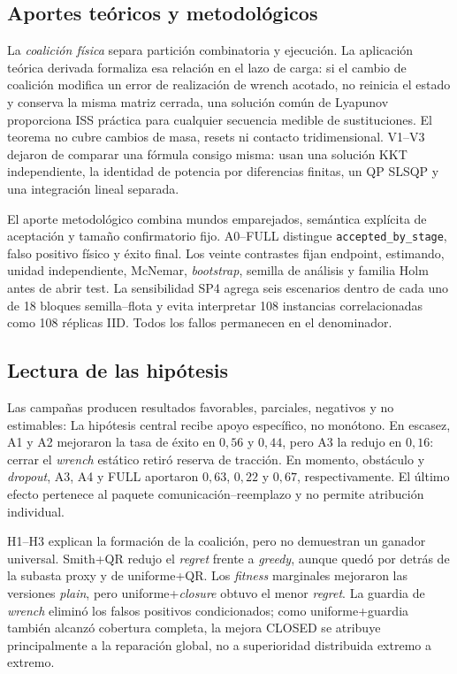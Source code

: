 \subsection*{Aportes teóricos y metodológicos}

La \emph{coalición física} separa partición combinatoria y ejecución. La aplicación teórica derivada formaliza esa relación en el lazo de carga: si el cambio de coalición modifica un error de realización de wrench acotado, no reinicia el estado y conserva la misma matriz cerrada, una solución común de Lyapunov proporciona ISS práctica para cualquier secuencia medible de sustituciones. El teorema no cubre cambios de masa, resets ni contacto tridimensional. V1--V3 dejaron de comparar una fórmula consigo misma: usan una solución KKT independiente, la identidad de potencia por diferencias finitas, un QP SLSQP y una integración lineal separada.

El aporte metodológico combina mundos emparejados, semántica explícita de aceptación y tamaño confirmatorio fijo. A0--FULL distingue \texttt{accepted\_by\_stage}, falso positivo físico y éxito final. Los veinte contrastes fijan endpoint, estimando, unidad independiente, McNemar, \emph{bootstrap}, semilla de análisis y familia Holm antes de abrir test. La sensibilidad SP4 agrega seis escenarios dentro de cada uno de 18 bloques semilla--flota y evita interpretar 108 instancias correlacionadas como 108 réplicas IID. Todos los fallos permanecen en el denominador.
\subsection*{Lectura de las hipótesis}

Las campañas producen resultados favorables, parciales, negativos y no estimables:
La hip\'otesis central recibe apoyo espec\'ifico, no mon\'otono. En escasez, A1 y A2 mejoraron la tasa de \'exito en $0{,}56$ y $0{,}44$, pero A3 la redujo en $0{,}16$: cerrar el \emph{wrench} est\'atico retir\'o reserva de tracci\'on. En momento, obst\'aculo y \emph{dropout}, A3, A4 y FULL aportaron $0{,}63$, $0{,}22$ y $0{,}67$, respectivamente. El \'ultimo efecto pertenece al paquete comunicaci\'on--reemplazo y no permite atribuci\'on individual.

H1--H3 explican la formaci\'on de la coalici\'on, pero no demuestran un ganador universal. Smith+QR redujo el \emph{regret} frente a \emph{greedy}, aunque qued\'o por detr\'as de la subasta proxy y de uniforme+QR. Los \emph{fitness} marginales mejoraron las versiones \emph{plain}, pero uniforme+\emph{closure} obtuvo el menor \emph{regret}. La guardia de \emph{wrench} elimin\'o los falsos positivos condicionados; como uniforme+guardia tambi\'en alcanz\'o cobertura completa, la mejora CLOSED se atribuye principalmente a la reparaci\'on global, no a superioridad distribuida extremo a extremo.

